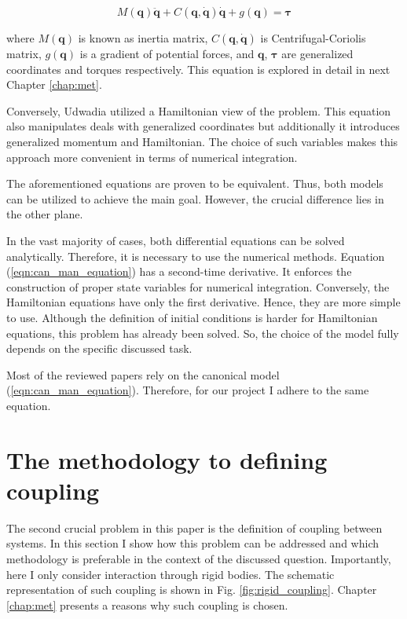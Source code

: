 \begin{equation} \label{eqn:can_man_equation}
   M(\mathbf{q})\ddot{\mathbf{q}} +
   C(\mathbf{q}, \dot{\mathbf{q}}) \dot{\mathbf{q}} +
   g(\mathbf{q}) =
   \boldsymbol{\tau}
\end{equation}


where $M(\mathbf{q})$ is known as inertia matrix, $C(\mathbf{q}, \dot{\mathbf{q}})$
is Centrifugal-Coriolis matrix, $g(\mathbf{q})$ is a gradient
of potential forces, and $\mathbf{q}$, $\boldsymbol{\tau}$ are generalized
coordinates and torques respectively. This equation is explored in detail
in next Chapter \ref{chap:met}.


Conversely, Udwadia \cite{ConstHamiltonSys} utilized a Hamiltonian view of the
problem. This equation also manipulates deals with generalized coordinates but
additionally it introduces generalized momentum and Hamiltonian. The choice of
such variables makes this approach more convenient in terms of numerical
integration.


The aforementioned equations are proven to be equivalent. Thus, both models
can be utilized to achieve the main goal. However, the crucial difference
lies in the other plane.


In the vast majority of cases, both differential equations can be solved
analytically. Therefore, it is necessary to use the numerical methods. Equation 
(\ref{eqn:can_man_equation}) has a second-time derivative. It enforces the 
construction of proper state variables for numerical integration. Conversely, 
the Hamiltonian equations have only the first derivative. Hence, they are more 
simple to use. Although the definition of initial conditions is harder for 
Hamiltonian equations, this problem has already been solved. So, the choice of 
the model fully depends on the specific discussed task.


Most of the reviewed papers rely on the canonical model
(\ref{eqn:can_man_equation}). Therefore, for our project I adhere to 
the same equation.


\section{The methodology to defining coupling} \label{sec:interaction_def}


The second crucial problem in this paper is the definition of coupling between
systems. In this section I show how this problem can be addressed and 
which methodology is preferable in the context of the discussed question. Importantly, 
here I only consider interaction through rigid bodies. The schematic representation 
of such coupling is shown in Fig. \ref{fig:rigid_coupling}. Chapter \ref{chap:met} 
presents a reasons why such coupling is chosen.


